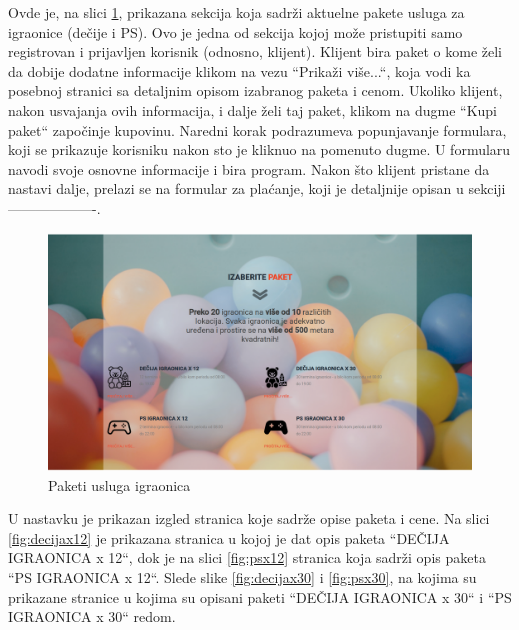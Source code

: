 \documentclass[../main.tex]{subfiles}
\begin{document}
Ovde je, na slici \ref{fig:igraonice}, prikazana sekcija koja sadrži aktuelne pakete usluga za igraonice (dečije i PS). Ovo je jedna od sekcija kojoj može pristupiti samo registrovan i prijavljen korisnik (odnosno, klijent). Klijent bira paket o kome želi da dobije dodatne informacije klikom na vezu ``Prikaži više...``, koja vodi ka posebnoj stranici sa detaljnim opisom izabranog paketa i cenom. Ukoliko klijent, nakon usvajanja ovih informacija, i dalje želi taj paket, klikom na dugme ``Kupi paket`` započinje kupovinu. Naredni korak podrazumeva popunjavanje formulara, koji se prikazuje korisniku nakon sto je kliknuo na pomenuto dugme. U formularu navodi svoje osnovne informacije i bira program. Nakon što klijent pristane da nastavi dalje, prelazi se na formular za plaćanje, koji je detaljnije opisan u sekciji-------------------.

\begin{figure}[!ht]
\begin{center}
\includegraphics[scale=0.22]{sections/korisnicki_interfejs/screenshots/ponude_igraonice.png}
\end{center}
\caption{Paketi usluga igraonica}
\label{fig:igraonice}
\end{figure}

U nastavku je prikazan izgled stranica koje sadrže opise paketa i cene. Na slici \ref{fig:decijax12} je prikazana stranica u kojoj je dat opis paketa ``DEČIJA IGRAONICA x 12``, dok je na slici \ref{fig:psx12} stranica koja sadrži opis paketa ``PS IGRAONICA x 12``. Slede slike \ref{fig:decijax30} i \ref{fig:psx30}, na kojima su prikazane stranice u kojima su opisani paketi ``DEČIJA IGRAONICA x 30`` i ``PS IGRAONICA x 30`` redom.
\end{document}
